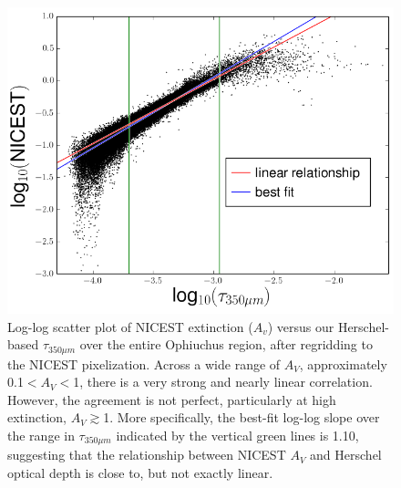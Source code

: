 \documentclass[11pt,a4paper]{emulateapj}
\begin{document}
\begin{figure}[ht]
\centering
\includegraphics[scale=0.475]{fig/scatter_herschel_nicest.png}
\caption{\label{fig:herschel_nicest} Log-log scatter plot of NICEST extinction ($A_v$) versus our Herschel-based $\tau_{350\mu m}$ over the entire Ophiuchus region, after regridding to the NICEST pixelization. Across a wide range of $A_V$, approximately 0.1$<$$A_V$$<$1, there is a very strong and nearly linear correlation. However, the 
agreement is not perfect, particularly at high extinction, $A_V$$\gtrsim$1. More specifically, the best-fit log-log slope over the range in $\tau_{350\mu m}$ indicated by the vertical green lines is 1.10, suggesting that the relationship between NICEST $A_V$ and Herschel optical depth is close to, but not exactly linear.}
\end{figure}

\end{document}
